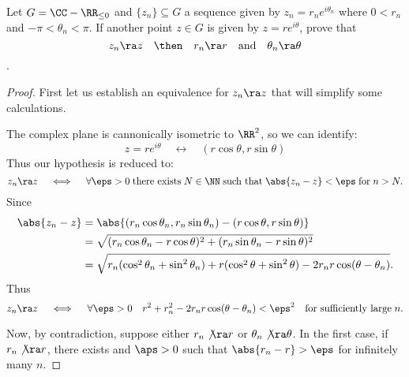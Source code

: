 \begin{exer}{9}
Let $G=\CC - \RR_{\leq 0}$ and $\{z_n\}\subseteq G$ a sequence given by $z_n=r_n e^{i \theta_n}$
where $0<r_n$ and $-\pi<\theta_n<\pi$. If another point $z\in G$ is given by $z=r e^{i\theta}$,
prove that $$z_n\ra z \quad\then\quad r_n\ra r \quad\text{and}\quad \theta_n\ra\theta$$.
\end{exer}
\begin{proof}
First let us establish an equivalence for $z_n\ra z$ that will simplify some calculations.

The complex plane is cannonically isometric to $\RR^2$, so we can identify:
\[
	z=r e^{i\theta} \quad\longleftrightarrow\quad (r\cos \theta, r\sin \theta)
\]
Thus our hypothesis is reduced to:
\[
	z_n\ra z \quad\iff\quad \forall \eps>0 \;\text{there exists}\;N\in\NN\;\text{such that}\; %
	\abs{z_n-z}<\eps \;\text{for}\; n>N.	
\]
Since
\begin{align*}
	\abs{z_n-z}&=\abs{(r_n\cos\theta_n, r_n\sin\theta_n)-(r\cos\theta,r\sin\theta)}\\  %
		&=\sqrt{(r_n\cos\theta_n-r\cos\theta)^2+(r_n\sin\theta_n-r\sin\theta)^2}\\
		&=\sqrt{r_n(\cos^2 \theta_n+\sin^2\theta_n)+r(\cos^2\theta+\sin^2\theta)- %
			2r_n r\cos(\theta-\theta_n)}.
\end{align*}
Thus
\[
	z_n\ra z \quad\iff\quad \forall\eps>0\quad r^2+r_n^2 -2r_nr\cos(\theta-\theta_n)<\eps^2\quad %
	\text{for sufficiently large}\; n.
\]

Now, by contradiction, suppose either $r_n\not\ra r$ or $\theta_n\not\ra\theta$. In the first case,
if $r_n\not\ra r$, there exists and $\aps>0$ such that $\abs{r_n-r}>\eps$ for infinitely many $n$.

\end{proof}
